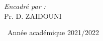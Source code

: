 \begin{titlepage}
\begin{center}
\begin{minipage}{0.4\textwidth}
\begin{flushleft}
\end{flushleft}
\end{minipage}
\begin{minipage}{0.4\textwidth}
\begin{flushright} \large
\emph{Encadré par :} \\[0.5 cm]
Pr. D. \textsc{ZAIDOUNI}\\
 
\end{flushright}
\end{minipage}



\vfill


{\large \ Année académique 2021/2022}

\end{center}
\end{titlepage}